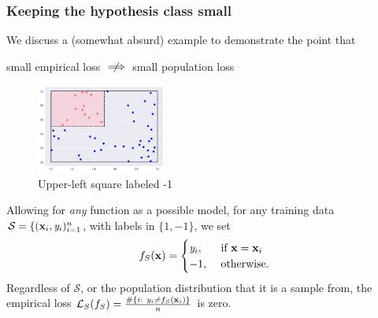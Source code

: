 \documentclass[smaller]{beamer}
\theoremstyle{example}
\newcommand{\x}{\textbf{x}}
\newcommand{\ix}[1]{{\it #1}}
\begin{document}
\begin{frame}
    \frametitle{Keeping the hypothesis class small}
We discuss a (somewhat absurd) example to demonstrate the point that 
\begin{center} small empirical loss $\centernot\implies$ small population loss\end{center}

\begin{figure}
    \begin{center}
        \includegraphics[width=0.38\textwidth]{../../Images/fourth_square-13v37.png}
    \end{center}
    \caption{Upper-left square labeled -1}
\end{figure}

Allowing for \textit{any} function as a possible model, for any training data $\mathcal S = \{(\x_i, \ix y_i)_{i=1}^n$, with labels in $\{1,-1\}$, we set 
        \[f_S(\x) = \begin{cases}\ix y_i,& \textrm{ if }\x = \x_i \\ 
                                    -1,& \textrm{ otherwise.}
        \end{cases}\]
Regardless of $\mathcal S$, or the population distribution that it is a sample from, the empirical loss $\mathcal L_{S}(f_S) = \frac{\#\{i:\ \ix y_i \ne f_S(\x_i)\}}{n}$ is zero.
\end{frame}
\end{document}
